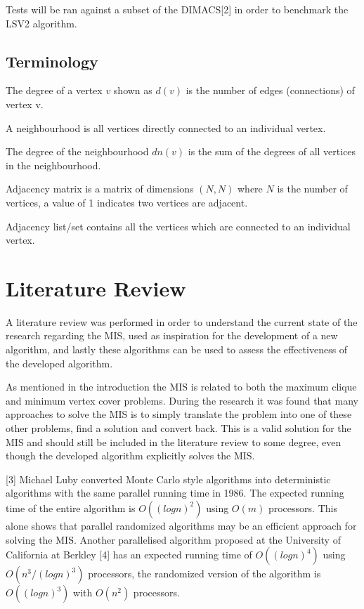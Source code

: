 \documentclass[conference]{IEEEtran}
\begin{document}
Tests will be ran against a subset of the DIMACS[2] in order to benchmark the LSV2 algorithm.

\subsection{Terminology}

The degree of a vertex $v$ shown as $d(v)$ is the number of edges (connections) of vertex v.

A neighbourhood is all vertices directly connected to an individual vertex.

The degree of the neighbourhood $dn(v)$ is the sum of the degrees of all vertices in the neighbourhood.

Adjacency matrix is a matrix of dimensions $(N, N)$ where $N$ is the number of vertices, a value of 1 indicates two
vertices are adjacent.

Adjacency list/set contains all the vertices which are connected to an individual vertex.

\section{Literature Review}
A literature review was performed in order to understand the current state of the research regarding the MIS, 
used as inspiration for the development of a new algorithm, and lastly these algorithms can be used to assess the 
effectiveness of the developed algorithm.

As mentioned in the introduction the MIS is related to both the maximum clique and minimum vertex cover problems. During
the research it was found that many approaches to solve the MIS is to simply translate the problem into one of these 
other problems, find a solution and convert back. This is a valid solution for the MIS and should still be included in 
the literature review to some degree, even though the developed algorithm explicitly solves the MIS.  

[3] Michael Luby converted Monte Carlo style algorithms into deterministic algorithms with the same parallel running
time in 1986. The expected running time of the entire algorithm is $O((logn)^2)$ using $O(m)$ processors. This alone 
shows that parallel randomized algorithms may be an efficient approach for solving the MIS. Another parallelised 
algorithm proposed at the University of California at Berkley [4] has an expected running time of $O((logn)^4)$ using
$O(n^3 / (logn) ^ 3)$ processors, the randomized version of the algorithm is $O((logn)^3)$ with $O(n^2)$ processors.
\end{document}
